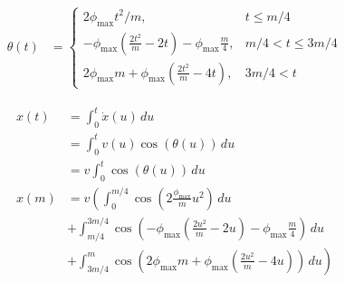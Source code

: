\documentclass{article}
\begin{document}
\begin{align}
  \theta\left(t\right) &= \left\{
    \begin{array}{cc}
      2\phi_{\max} t^2 / m,   & t \le m/4\\
      -\phi_{\max}\left(\frac{2t^{2}}{m}-2t\right) - \phi_{\max}\frac{m}{4},& m/4 < t \le 3m/4\\
      2\phi_{\max}m + \phi_{\max}\left(\frac{2t^{2}}{m}-4t\right), & 3m/4 < t
    \end{array}
  \right.
\end{align}

\begin{align}
  x\left(t\right) &= \int_{0}^{t} \dot{x}\left(u\right)\,du\\
  &= \int_{0}^{t} v\left(u\right)\cos\left(\theta\left(u\right)\right)\,du\\
  &= v \int_{0}^{t} \cos\left(\theta\left(u\right)\right)\,du\\
  x\left(m\right) &= v \left(\int_{0}^{m/4} \cos\left(2\frac{\phi_{\max}}{m} u^2\right)\,du\right.\\
  &+ \int_{m/4}^{3m/4} \cos\left(-\phi_{\max}\left(\frac{2u^{2}}{m}-2u\right) - \phi_{\max}\frac{m}{4}\right)\,du\\
  &+ \left.\int_{3m/4}^{m} \cos\left(2\phi_{\max}m + \phi_{\max}\left(\frac{2u^{2}}{m}-4u\right)\right)\,du\right)
\end{align}
\end{document}
